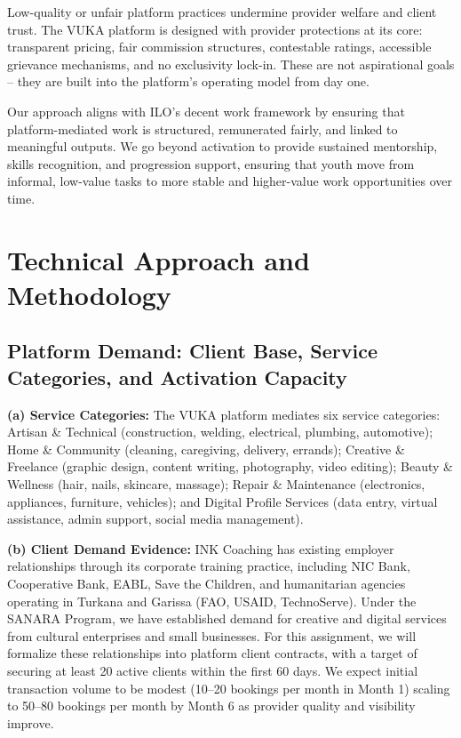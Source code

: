\documentclass[11pt,a4paper]{article}
\begin{document}
\noindent Low-quality or unfair platform practices undermine provider welfare and client trust. The VUKA platform is designed with provider protections at its core: transparent pricing, fair commission structures, contestable ratings, accessible grievance mechanisms, and no exclusivity lock-in. These are not aspirational goals -- they are built into the platform's operating model from day one.

\noindent Our approach aligns with ILO's decent work framework by ensuring that platform-mediated work is structured, remunerated fairly, and linked to meaningful outputs. We go beyond activation to provide sustained mentorship, skills recognition, and progression support, ensuring that youth move from informal, low-value tasks to more stable and higher-value work opportunities over time.

\section{Technical Approach and Methodology}
\subsection{Platform Demand: Client Base, Service Categories, and Activation Capacity}
\textbf{(a) Service Categories:} The VUKA platform mediates six service categories: Artisan \& Technical (construction, welding, electrical, plumbing, automotive); Home \& Community (cleaning, caregiving, delivery, errands); Creative \& Freelance (graphic design, content writing, photography, video editing); Beauty \& Wellness (hair, nails, skincare, massage); Repair \& Maintenance (electronics, appliances, furniture, vehicles); and Digital Profile Services (data entry, virtual assistance, admin support, social media management).

\noindent \textbf{(b) Client Demand Evidence:} INK Coaching has existing employer relationships through its corporate training practice, including NIC Bank, Cooperative Bank, EABL, Save the Children, and humanitarian agencies operating in Turkana and Garissa (FAO, USAID, TechnoServe). Under the SANARA Program, we have established demand for creative and digital services from cultural enterprises and small businesses. For this assignment, we will formalize these relationships into platform client contracts, with a target of securing at least 20 active clients within the first 60 days. We expect initial transaction volume to be modest (10--20 bookings per month in Month 1) scaling to 50--80 bookings per month by Month 6 as provider quality and visibility improve.
\end{document}
